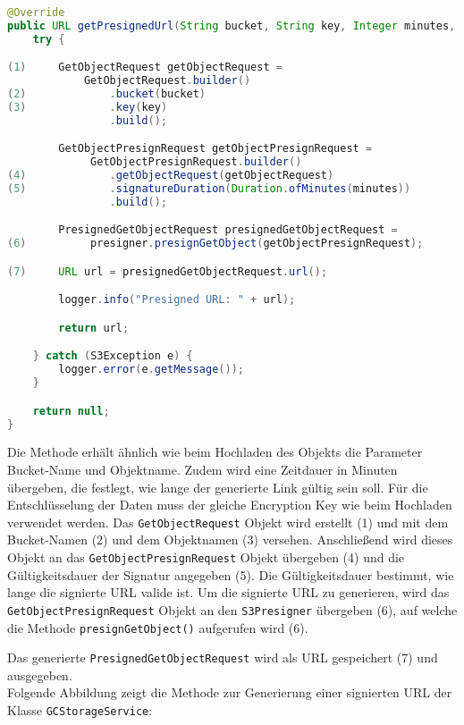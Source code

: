 \begin{lstlisting}[language=Java, caption=Prototyp Code Snippet - Generierung einer signierten URL durch AWS]
@Override
public URL getPresignedUrl(String bucket, String key, Integer minutes, String encryptionKey) {
    try {

(1)     GetObjectRequest getObjectRequest = 
			GetObjectRequest.builder()
(2)             .bucket(bucket)
(3)             .key(key)
                .build();

        GetObjectPresignRequest getObjectPresignRequest =                  
             GetObjectPresignRequest.builder()
(4)             .getObjectRequest(getObjectRequest)
(5)             .signatureDuration(Duration.ofMinutes(minutes))
                .build();

        PresignedGetObjectRequest presignedGetObjectRequest =                  
(6)          presigner.presignGetObject(getObjectPresignRequest);

(7)     URL url = presignedGetObjectRequest.url();

        logger.info("Presigned URL: " + url);

        return url;

    } catch (S3Exception e) {
        logger.error(e.getMessage());
    }

    return null;
}
\end{lstlisting}

Die Methode erhält ähnlich wie beim Hochladen des Objekts die Parameter Bucket-Name und Objektname. Zudem wird eine Zeitdauer in Minuten übergeben, die festlegt, wie lange der generierte Link gültig sein soll. Für die Entschlüsselung der Daten muss der gleiche Encryption Key wie beim Hochladen verwendet werden. Das \verb|GetObjectRequest| Objekt wird erstellt (1) und mit dem Bucket-Namen (2) und dem Objektnamen (3) versehen. Anschließend wird dieses Objekt an das \verb|GetObjectPresignRequest| Objekt übergeben (4) und die Gültigkeitsdauer der Signatur angegeben (5). Die Gültigkeitsdauer bestimmt, wie lange die signierte URL valide ist. Um die signierte URL zu generieren, wird das \verb|GetObjectPresignRequest| Objekt an den \verb|S3Presigner| übergeben (6), auf welche die Methode \verb|presignGetObject()| aufgerufen wird (6). 

Das generierte \verb|PresignedGetObjectRequest| wird als URL gespeichert (7) und ausgegeben.\\

Folgende Abbildung zeigt die Methode zur Generierung einer signierten URL der \\Klasse \verb|GCStorageService|:

